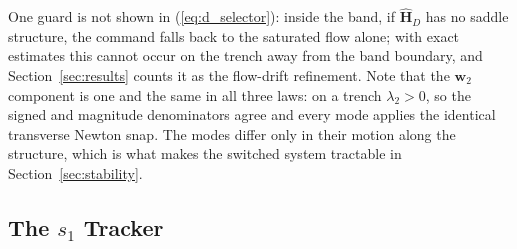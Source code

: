 \documentclass[lettersize,journal]{IEEEtran}
\begin{document}
One guard is not shown in (\ref{eq:d_selector}): inside the band, if $\hat{\mathbf{H}}_D$ has no
saddle structure, the command falls back to the saturated flow alone;
with exact estimates this cannot occur on the trench away from the band
boundary, and Section~\ref{sec:results} counts it as the flow-drift
refinement. Note that the $\mathbf{w}_2$ component is one and the same
in all three laws: on a trench $\lambda_2 > 0$, so the signed and
magnitude denominators agree and every mode applies the identical
transverse Newton snap. The modes differ only in their motion along the
structure, which is what makes the switched system tractable in
Section~\ref{sec:stability}.

\subsection{The $s_1$ Tracker}
\label{sec:oecs_controller}
\end{document}
